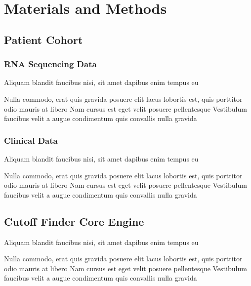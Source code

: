 \documentclass[
paper=landscape,
paper=160mm:90mm, %
fontsize=11pt, %
pagesize, %
parskip=half-, %
]{scrartcl} %
\theoremstyle{mythmstyle} %
\begin{document}
\section{Materials and Methods} %
\subsection{Patient Cohort} 
\subsubsection{RNA Sequencing Data} 

\begin{outline}

\1 Aliquam blandit faucibus nisi, sit amet dapibus enim tempus eu

\2 Nulla commodo, erat quis gravida posuere
\1 elit lacus lobortis est, quis porttitor odio mauris at libero
\1 Nam cursus est eget velit posuere pellentesque
\1 Vestibulum faucibus velit a augue condimentum quis convallis nulla gravida

\end{outline}


\clearpage

\subsubsection{Clinical Data} 

\begin{outline}

\1 Aliquam blandit faucibus nisi, sit amet dapibus enim tempus eu

\2 Nulla commodo, erat quis gravida posuere
\1 elit lacus lobortis est, quis porttitor odio mauris at libero
\1 Nam cursus est eget velit posuere pellentesque
\1 Vestibulum faucibus velit a augue condimentum quis convallis nulla gravida

\end{outline}


\clearpage

\subsection{Cutoff Finder Core Engine}

\begin{outline}

\1 Aliquam blandit faucibus nisi, sit amet dapibus enim tempus eu

\2 Nulla commodo, erat quis gravida posuere
\1 elit lacus lobortis est, quis porttitor odio mauris at libero
\1 Nam cursus est eget velit posuere pellentesque
\1 Vestibulum faucibus velit a augue condimentum quis convallis nulla gravida

\end{outline}
\end{document}
